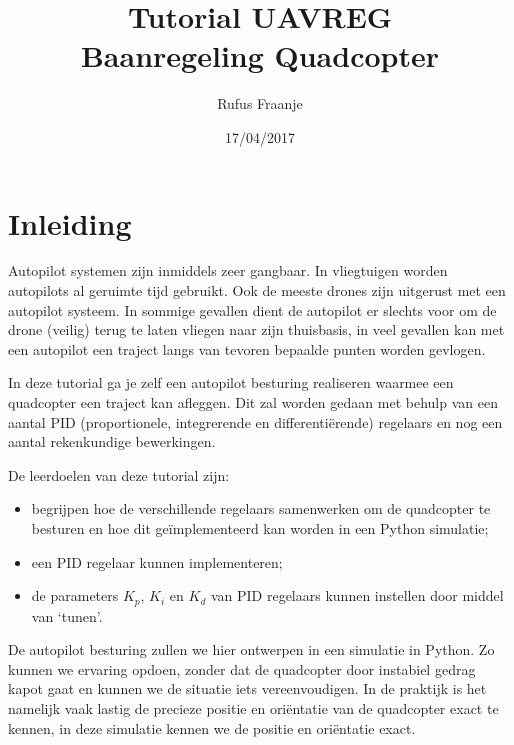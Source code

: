 \documentclass[a4paper,11pt]{article}
\title{Tutorial UAVREG\\ Baanregeling Quadcopter}
\author{Rufus Fraanje}
\date{17/04/2017}
\begin{document}
\maketitle

\section{Inleiding}
Autopilot systemen zijn inmiddels zeer gangbaar. In vliegtuigen worden
autopilots al geruimte tijd gebruikt. Ook de meeste drones zijn uitgerust met
een autopilot systeem. In sommige gevallen dient de autopilot er slechts voor
om de drone (veilig) terug te laten vliegen naar zijn thuisbasis, in veel
gevallen kan met een autopilot een traject langs van tevoren bepaalde punten
worden gevlogen. 

In deze tutorial ga je zelf een autopilot besturing realiseren waarmee een
quadcopter een traject kan afleggen. Dit zal worden gedaan met behulp van een
aantal PID (proportionele, integrerende en differenti\"erende) regelaars en
nog een aantal rekenkundige bewerkingen. 

De leerdoelen van deze tutorial zijn:
\begin{itemize}
  \item begrijpen hoe de verschillende regelaars samenwerken om de quadcopter
    te besturen en hoe dit ge\"implementeerd kan worden in een Python simulatie;
  \item een PID regelaar kunnen implementeren;
  \item de parameters $K_p$, $K_i$ en $K_d$ van PID regelaars kunnen
    instellen door middel van `tunen'.
\end{itemize}
De autopilot besturing zullen we hier ontwerpen in een simulatie in
Python. Zo kunnen we ervaring opdoen, zonder dat de quadcopter door instabiel
gedrag kapot gaat en
kunnen we de situatie iets vereenvoudigen. In de praktijk is het namelijk vaak lastig
de precieze positie en ori\"entatie van de quadcopter exact te kennen, in deze
simulatie kennen we de positie en ori\"entatie exact. 
\end{document}
